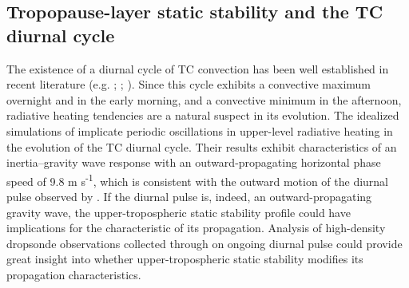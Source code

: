 \subsection{Tropopause-layer static stability and the TC diurnal cycle}

The existence of a diurnal cycle of TC convection has been well established in recent literature (e.g. \citeauthor{Kossin2002} \citeyear{Kossin2002}; \citeauthor{Dunionetal2014} \citeyear{Dunionetal2014}; \citeauthor{BowmanFowler2015} \citeyear{BowmanFowler2015}).
Since this cycle exhibits a convective maximum overnight and in the early morning, and a convective minimum in the afternoon, radiative heating tendencies are a natural suspect in its evolution.
The idealized simulations of \cite{NavarroHakim2016} implicate periodic oscillations in upper-level radiative heating in the evolution of the TC diurnal cycle.
Their results exhibit characteristics of an inertia--gravity wave response with an outward-propagating horizontal phase speed of 9.8 m s\textsuperscript{-1}, which is consistent with the outward motion of the diurnal pulse observed by \cite{Dunionetal2014}. If the diurnal pulse is, indeed, an outward-propagating gravity wave, the upper-tropospheric static stability profile could have implications for the characteristic of its propagation.
Analysis of high-density dropsonde observations collected through on ongoing diurnal pulse could provide great insight into whether upper-tropospheric static stability modifies its propagation characteristics. 
